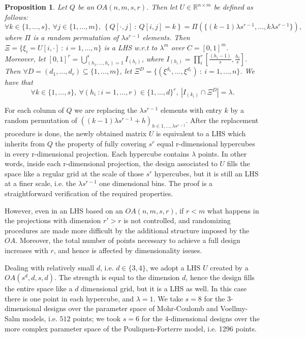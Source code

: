 \documentclass{article}
\newtheorem{proposition}[theorem]{Proposition}
\begin{document}
\begin{proposition}
Let $Q$ be an $OA(n,m,s,r)$. Then let $U\in\mathbb R^{n\times m}$ be defined as follows:
$$\forall k\in \{1,\dots,s\},\ \forall j\in \{1,\dots,m\},\ \left\{Q[\cdot,j]\ :\ Q[i,j]=k\right\} = \Pi\left(\{(k-1)\lambda s^{r-1},\dots, k\lambda s^{r-1}\}\right),$$
where $\Pi$ is a random permutation of $\lambda s^{r-1}$ elements. Then $\Xi=\{\xi_i=U[i,\cdot]\ :\ i=1,\dots,n\}$ is a LHS w.r.t to $\lambda^m$ over $C=[0,1]^m$. Moreover, let $[0,1]^r=\bigcup_{(h_1,\dots,h_r)=1}^{s} I_{(h_i)}$, where $I_{(h_i)}=\prod^r_i[\frac{(h_i-1)}{s},\frac{h_i}{s}]$. Then $\forall D=(d_1,\dots,d_r)\subseteq \{1,\dots,m\}$, let $\Xi^D=\{(\xi^{d_1},\dots,\xi^{d_r})\ :\ i=1,\dots,n\}$. We have that
$$\forall k\in \{1,\dots,s\},\ \forall (h_i\ : i=1,\dots,r)\in\{1,\dots,d\}^r,\ \left|I_{(k_i)}\cap\Xi^D\right|=\lambda.$$
\end{proposition}

For each column of $Q$ we are replacing the $\lambda s^{r-1}$ elements with entry $k$ by a random permutation of $\left((k-1)\lambda s^{r-1} + h\right)_{h\in 1,\dots, \lambda s^{r-1}}$. After the replacement procedure is done, the newly obtained matrix $U$ is equivalent to a LHS which inherits from $Q$ the property of fully covering $s^r$ equal r-dimensional hypercubes in every r-dimensional projection. Each hypercube contains $\lambda$ points. In other words, inside each r-dimensional projection, the design associated to $U$ fills the space like a regular grid at the scale of those $s^r$ hypercubes, but it is still an LHS at a finer scale, i.e. the $\lambda s^{r-1}$ one dimensional bins. The proof is a straightforward verification of the required properties.

However, even in an LHS based on an $OA(n,m,s,r)$, if $r<m$ what happens in the projections with dimension $r'>r$ is not controlled, and randomizing procedures are made more difficult by the additional structure imposed by the $OA$. Moreover, the total number of points necessary to achieve a full design increases with $r$, and hence is affected by dimensionality issues.

Dealing with relatively small $d$, i.e. $d\in\{3,4\}$, we adopt a LHS $U$ created by a $OA(s^d,d,s,d)$. The strength is equal to the dimension $d$, hence the design fills the entire space like a $d$ dimensional grid, but it is a LHS as well. In this case there is one point in each hypercube, and $\lambda=1$. We take $s=8$ for the 3-dimensional designs over the parameter space of Mohr-Coulomb and Voellmy-Salm models, i.e. $512$ points; we took $s=6$ for the 4-dimensional designs over the more complex parameter space of the Pouliquen-Forterre model, i.e. 1296 points.
\end{document}
